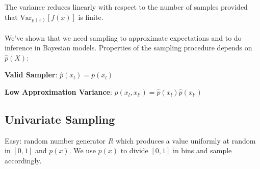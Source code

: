 \documentclass[10pt]{report}
\begin{document}
The variance reduces linearly with respect to the number of samples provided that $\text{Var}_{p(x)}[f(x)]$ is finite.\\\\
We've shown that we need sampling to approximate expectations and to do inference in Bayesian models. Properties of the sampling procedure depends on $\hat{p}(X)$:
\begin{list}{}{}
	\item \textbf{Valid Sampler}: $\hat{p}(x_l) = p(x_l)$
	\item \textbf{Low Approximation Variance}: $\hat{p}(x_l,x_{l'}) = \hat{p}(x_l)\hat{p}(x_{l'})$
\end{list}
\pagebreak
\subsection{Univariate Sampling}
Easy: random number generator $R$ which produces a value uniformly at random in $[0,1]$ and $p(x)$. We use $p(x)$ to divide $[0,1]$ in bins and sample accordingly.
\end{document}

